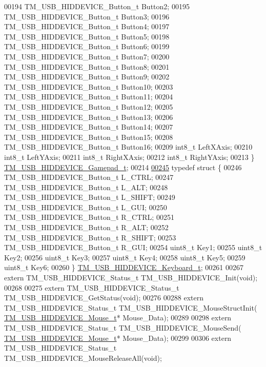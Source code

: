 \begin{DoxyCode}
00194     TM\_USB\_HIDDEVICE\_Button\_t Button2;
00195     TM\_USB\_HIDDEVICE\_Button\_t Button3;
00196     TM\_USB\_HIDDEVICE\_Button\_t Button4;
00197     TM\_USB\_HIDDEVICE\_Button\_t Button5;
00198     TM\_USB\_HIDDEVICE\_Button\_t Button6;
00199     TM\_USB\_HIDDEVICE\_Button\_t Button7;
00200     TM\_USB\_HIDDEVICE\_Button\_t Button8;
00201     TM\_USB\_HIDDEVICE\_Button\_t Button9;
00202     TM\_USB\_HIDDEVICE\_Button\_t Button10;
00203     TM\_USB\_HIDDEVICE\_Button\_t Button11;
00204     TM\_USB\_HIDDEVICE\_Button\_t Button12;
00205     TM\_USB\_HIDDEVICE\_Button\_t Button13;
00206     TM\_USB\_HIDDEVICE\_Button\_t Button14;
00207     TM\_USB\_HIDDEVICE\_Button\_t Button15;
00208     TM\_USB\_HIDDEVICE\_Button\_t Button16;
00209     int8\_t LeftXAxis;
00210     int8\_t LeftYAxis;
00211     int8\_t RightXAxis;
00212     int8\_t RightYAxis;
00213 \} \hyperlink{struct_t_m___u_s_b___h_i_d_d_e_v_i_c_e___gamepad__t}{TM\_USB\_HIDDEVICE\_Gamepad\_t};
00214 
\hypertarget{tm__stm32f4__usb__hid__device_8h_source_l00245}{}\hyperlink{struct_t_m___u_s_b___h_i_d_d_e_v_i_c_e___keyboard__t}{00245} \textcolor{keyword}{typedef} \textcolor{keyword}{struct }\{
00246     TM\_USB\_HIDDEVICE\_Button\_t L\_CTRL;
00247     TM\_USB\_HIDDEVICE\_Button\_t L\_ALT;
00248     TM\_USB\_HIDDEVICE\_Button\_t L\_SHIFT;
00249     TM\_USB\_HIDDEVICE\_Button\_t L\_GUI;
00250     TM\_USB\_HIDDEVICE\_Button\_t R\_CTRL;
00251     TM\_USB\_HIDDEVICE\_Button\_t R\_ALT;
00252     TM\_USB\_HIDDEVICE\_Button\_t R\_SHIFT;
00253     TM\_USB\_HIDDEVICE\_Button\_t R\_GUI;
00254     uint8\_t Key1;
00255     uint8\_t Key2;
00256     uint8\_t Key3;
00257     uint8\_t Key4;
00258     uint8\_t Key5;
00259     uint8\_t Key6;
00260 \} \hyperlink{struct_t_m___u_s_b___h_i_d_d_e_v_i_c_e___keyboard__t}{TM\_USB\_HIDDEVICE\_Keyboard\_t};
00261 
00267 \textcolor{keyword}{extern} TM\_USB\_HIDDEVICE\_Status\_t TM\_USB\_HIDDEVICE\_Init(\textcolor{keywordtype}{void});
00268 
00275 \textcolor{keyword}{extern} TM\_USB\_HIDDEVICE\_Status\_t TM\_USB\_HIDDEVICE\_GetStatus(\textcolor{keywordtype}{void});
00276 
00288 \textcolor{keyword}{extern} TM\_USB\_HIDDEVICE\_Status\_t TM\_USB\_HIDDEVICE\_MouseStructInit(
      \hyperlink{struct_t_m___u_s_b___h_i_d_d_e_v_i_c_e___mouse__t}{TM\_USB\_HIDDEVICE\_Mouse\_t}* Mouse\_Data);
00289 
00298 \textcolor{keyword}{extern} TM\_USB\_HIDDEVICE\_Status\_t TM\_USB\_HIDDEVICE\_MouseSend(
      \hyperlink{struct_t_m___u_s_b___h_i_d_d_e_v_i_c_e___mouse__t}{TM\_USB\_HIDDEVICE\_Mouse\_t}* Mouse\_Data);
00299 
00306 \textcolor{keyword}{extern} TM\_USB\_HIDDEVICE\_Status\_t TM\_USB\_HIDDEVICE\_MouseReleaseAll(\textcolor{keywordtype}{void});

\end{DoxyCode}
